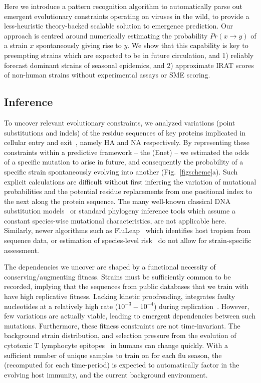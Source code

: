 \documentclass[onecolumn, compsoc,10pt]{IEEEtran}
\begin{document}
Here we introduce a pattern recognition algorithm to automatically parse out emergent evolutionary constraints operating on \infl viruses in the wild, to provide a less-heuristic theory-backed scalable solution to emergence prediction. Our approach is centred around numerically estimating the probability $Pr(x \rightarrow y)$ of a strain $x$ spontaneously giving rise to  $y$. We show that this capability is key to preempting  strains which are expected to be in future circulation, and  1) reliably forecast dominant strains of seasonal epidemics, and 2) approximate IRAT scores of non-human strains without  experimental assays or SME scoring.

\subsection*{\enet Inference}

To uncover relevant evolutionary constraints, we analyzed  variations (point substitutions and indels) of the  residue  sequences  of key proteins implicated  in cellular entry and exit~\cite{gamblin2010influenza,shao2017evolution}, namely HA and NA respectively. By representing these constraints within a predictive framework -- the \enet (Enet) -- we estimated the  odds of a specific mutation to arise in future, and consequently the probability of a specific strain spontaneously  evolving into another (Fig.~\ref{figscheme}a).  Such explicit calculations are difficult  without first inferring the variation of mutational probabilities and the potential residue replacements from one positional index to the next along the protein sequence. The many well-known classical  DNA  substitution models~\cite{posada1998modeltest} or standard phylogeny inference tools which assume a constant species-wise mutational characteristics,  are not applicable here. Similarly, newer algorithms such  as FluLeap~\cite{eng2014predicting}  which identifies host tropism from sequence data, or estimation of species-level risk~\cite{grange2021ranking} do not allow for strain-specific assessment.

The dependencies we uncover are shaped by  a  functional necessity of conserving/augmenting  fitness. Strains must be sufficiently common  to be recorded, implying that the sequences from public databases that we train  with have  high replicative fitness. Lacking kinetic proofreading, \infl integrates  faulty nucleotides   at a relatively high rate ($10^{-3}-10^{-4}$) during  replication~\cite{ahlquist2002rna,chen2006avian}. However, few variations are actually viable, leading to emergent dependencies between such mutations. Furthermore, these fitness constraints are not time-invariant. The background strain distribution, and selection pressure from the evolution of cytotoxic T lymphocyte  epitopes~\cite{woolthuis2016long,fan2012role,van2016differential,berkhoff2007assessment,van2012evasion} in humans can change quickly. With a sufficient number of unique samples to train on for each flu season, the \enet (recomputed for each time-period) is expected to automatically factor in the evolving host immunity, and the current background environment.  
\end{document}
